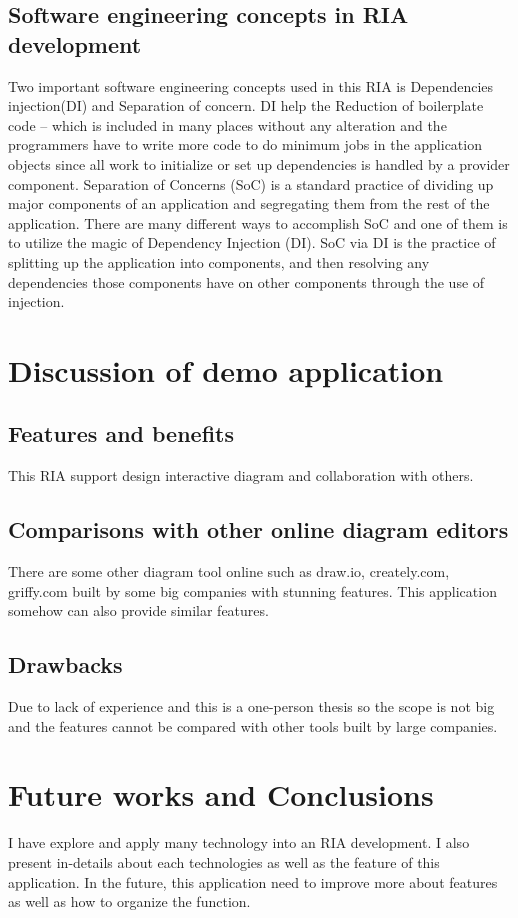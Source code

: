 \documentclass[14pt,a4paper]{extreport}
\begin{document}
		\subsection{Software engineering concepts in RIA development}
			Two important software engineering concepts used in this RIA is Dependencies injection(DI) and Separation of concern. DI help the Reduction of boilerplate code – which is included in many places without any alteration and the programmers have to write more code to do minimum jobs in the application objects since all work to initialize or set up dependencies is handled by a provider component. Separation of Concerns (SoC) is a standard practice of dividing up major components of an application and segregating them from the rest of the application. There are many different ways to accomplish SoC and one of them is to utilize the magic of Dependency Injection (DI). SoC via DI is the practice of splitting up the application into components, and then resolving any dependencies those components have on other components through the use of injection.
			
	\section{Discussion of demo application}
		\subsection{Features and benefits}
			This RIA support design interactive diagram and collaboration with others.
		\subsection{Comparisons with other online diagram editors}
			There are some other diagram tool online such as draw.io, creately.com, griffy.com built by some big companies with stunning features. This application somehow can also provide similar features.
		\subsection{Drawbacks}
			Due to lack of experience and this is a one-person thesis so the scope is not big and the features cannot be compared with other tools built by large companies.
	\section{Future works and Conclusions}
		I have explore and apply many technology into an RIA development. I also present in-details about each technologies as well as the feature of this application. In the future, this application need to improve more about features as well as how to organize the function.
\end{document}
